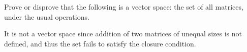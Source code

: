 
\begin{Exercise}[
name={},
title={}, 
difficulty=0,
origin={\cite{JH}}]
Prove or disprove that
the following is a vector space: the set of all matrices, under
the usual operations.
\end{Exercise}

\begin{Answer}

It is not a vector space since addition of two matrices of unequal
sizes is not defined, and thus the set fails to satisfy the closure
condition.


\end{Answer}
